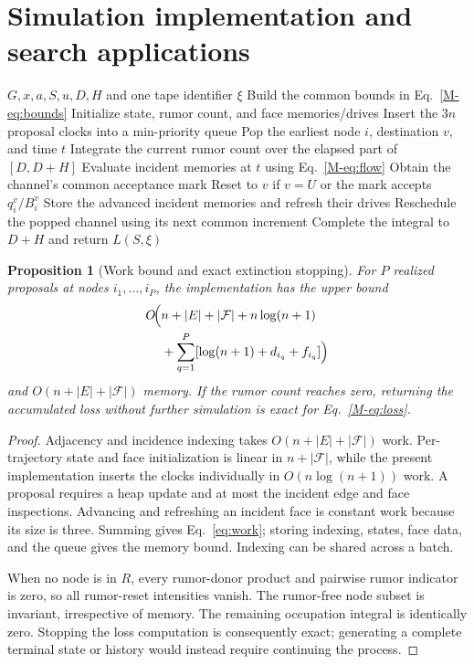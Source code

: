\documentclass[preprint,11pt,sort&compress]{elsarticle}
\newtheorem{proposition}[theorem]{Proposition}
\newcommand{\Fset}{\mathcal{F}}
\begin{document}
\section{Simulation implementation and search applications}\label{sec:full_computational_application}
\begin{algorithm}[t]
\caption{Exact reset-tape loss for a fixed target set}
\label{alg:simulation}
\begin{algorithmic}[1]
\Require $G,x,a,S,u,D,H$ and one tape identifier $\xi$
\State Build the common bounds in Eq.~\ref{M-eq:bounds}
\State Initialize state, rumor count, and face memories/drives
\State Insert the $3n$ proposal clocks into a min-priority queue
\State Pop the earliest node $i$, destination $v$, and time $t$
\State Integrate the current rumor count over the elapsed part of $[D,D+H]$
\State Evaluate incident memories at $t$ using Eq.~\ref{M-eq:flow}
\State Obtain the channel's common acceptance mark
\State Reset to $v$ if $v=U$ or the mark accepts $q_i^v/B_i^v$
\State Store the advanced incident memories and refresh their drives
\EndIf
\State Reschedule the popped channel using its next common increment
\EndWhile
\State Complete the integral to $D+H$ and return $L(S,\xi)$
\end{algorithmic}
\end{algorithm}
\begin{proposition}[Work bound and exact extinction stopping]
\label{prop:work}
For $P$ realized proposals at nodes $i_1,\ldots,i_P$, the implementation has the upper bound
\begin{align}
 O\!\Big(&n+|E|+|\Fset|+n\log(n+1)\notag\\
       &+\sum_{q=1}^P[\log(n+1)+d_{i_q}+f_{i_q}]\Big)
       \label{eq:work}
\end{align}
and $O(n+|E|+|\Fset|)$ memory. If the rumor count reaches zero, returning the accumulated loss without further simulation is exact for Eq.~\ref{M-eq:loss}.
\end{proposition}
\begin{proof}
Adjacency and incidence indexing takes $O(n+|E|+|\Fset|)$ work. Per-trajectory state and face initialization is linear in $n+|\Fset|$, while the present implementation inserts the clocks individually in $O(n\log(n+1))$ work. A proposal requires a heap update and at most the incident edge and face inspections. Advancing and refreshing an incident face is constant work because its size is three. Summing gives Eq.~\ref{eq:work}; storing indexing, states, face data, and the queue gives the memory bound. Indexing can be shared across a batch.

When no node is in $R$, every rumor-donor product and pairwise rumor indicator is zero, so all rumor-reset intensities vanish. The rumor-free node subset is invariant, irrespective of memory. The remaining occupation integral is identically zero. Stopping the loss computation is consequently exact; generating a complete terminal state or history would instead require continuing the process.
\end{proof}
\end{document}
